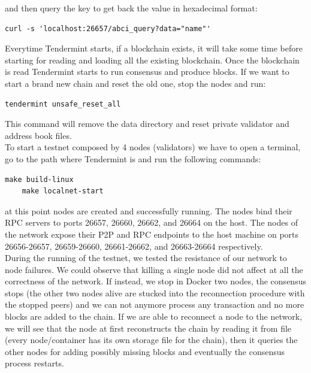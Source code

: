 \documentclass{article}
\begin{document}
	and then query the key to get back the value in hexadecimal format:
	\begin{lstlisting}[style=bashstyle]
	curl -s 'localhost:26657/abci_query?data="name"'
	\end{lstlisting}
	Everytime Tendermint starts, if a blockchain exists, it will take some time before starting for reading and loading all the existing blockchain. Once the blockchain is read Tendermint starts to run consensus and produce blocks. If we want to start a brand new chain and reset the old one, stop the nodes and run:
	\begin{lstlisting}[style=bashstyle]
	tendermint unsafe_reset_all
	\end{lstlisting}
	This command will remove the data directory and reset private validator and address book files.\\
\newline
	To start a testnet composed by 4 nodes (validators) we have to open a terminal, go to the path where Tendermint is and run the following commands:
	\begin{lstlisting}[style=bashstyle]
	make build-linux   
	make localnet-start 
	\end{lstlisting}
	at this point nodes are created and successfully running. The nodes bind their RPC servers to ports 26657, 26660, 26662, and 26664 on the host.
The nodes of the network expose their P2P and RPC endpoints to the host machine on ports 26656-26657, 26659-26660, 26661-26662, and 26663-26664 respectively.\\
\newline
During the running of the testnet, we tested the resistance of our network to node failures. We could observe that killing a single node did not affect at all the correctness of the network. If instead, we stop in Docker two nodes, the consensus stops (the other two nodes alive are stucked into the reconnection procedure with the stopped peers) and we can not anymore process any transaction and no more blocks are added to the chain. If we are able to reconnect a node to the network, we will see that the node at first reconstructs the chain by reading it from file (every node/container has its own storage file for the chain), then it queries the other nodes for adding possibly missing blocks and eventually the consensus process restarts.
	
\end{document}
